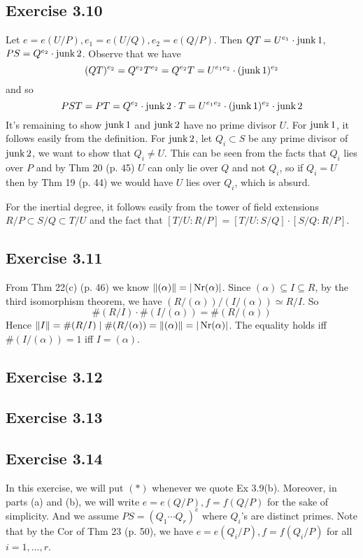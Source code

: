 \documentclass[../Marcus.tex]{subfiles}
\begin{document}
\subsection*{Exercise 3.10}

Let $e=e(U/P),e_1=e(U/Q),e_2=e(Q/P)$. Then $QT=U^{e_1}\cdot\operatorname{junk}1$, $PS=Q^{e_2}\cdot\operatorname{junk}2$. Observe that we have $$(QT)^{e_2}=Q^{e_2}T^{e_2}=Q^{e_2}T=U^{e_1e_2}\cdot(\operatorname{junk}1)^{e_2}$$ and so $$PST=PT=Q^{e_2}\cdot\operatorname{junk}2\cdot T=U^{e_1e_2}\cdot(\operatorname{junk}1)^{e_2}\cdot\operatorname{junk}2$$ It's remaining to show $\operatorname{junk}1$ and $\operatorname{junk}2$ have no prime divisor $U$. For $\operatorname{junk}1$, it follows easily from the definition. For $\operatorname{junk}2$, let $Q_i\subset S$ be any prime divisor of $\operatorname{junk}2$, we want to show that $Q_i\neq U$. This can be seen from the facts that $Q_i$ lies over $P$ and by Thm 20 (p. 45) $U$ can only lie over $Q$ and not $Q_i$, so if $Q_i=U$ then by Thm 19 (p. 44) we would have $U$ lies over $Q_i$, which is absurd.

For the inertial degree, it follows easily from the tower of field extensions $R/P\subset S/Q\subset T/U$ and the fact that $[T/U:R/P]=[T/U:S/Q]\cdot[S/Q:R/P]$.

\subsection*{Exercise 3.11}

From Thm 22(c) (p. 46) we know $\|(\alpha)\|=|\operatorname{Nr}(\alpha)|$. Since $(\alpha)\subseteq I \subseteq R$, by the third isomorphism theorem, we have $(R/(\alpha))/(I/(\alpha))\simeq R/I$. So $$\#(R/I)\cdot\#(I/(\alpha))=\#(R/(\alpha))$$ Hence $\|I\|=\#(R/I)\mid \#(R/(\alpha))=\|(\alpha)\|=|\operatorname{Nr}(\alpha)|$. The equality holds iff $\#(I/(\alpha))=1$ iff $I=(\alpha)$.

\subsection*{Exercise 3.12}

\subsection*{Exercise 3.13}

\subsection*{Exercise 3.14}

In this exercise, we will put $(*)$ whenever we quote Ex 3.9(b). Moreover, in parts (a) and (b), we will write $e=e(Q/P),f=f(Q/P)$ for the sake of simplicity. And we assume $PS=(Q_1\cdots Q_r)^e$ where $Q_i$'s are distinct primes. Note that by the Cor of Thm 23 (p. 50), we have $e=e(Q_i/P),f=f(Q_i/P)$ for all $i=1,\ldots,r$.
\end{document}
